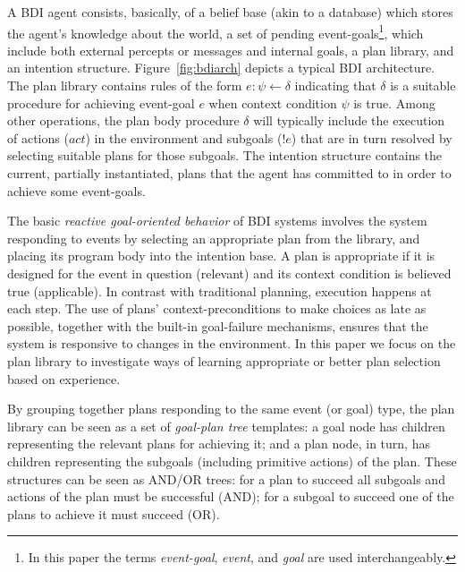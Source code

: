 A BDI agent consists, basically, of a belief base (akin to a
database) which stores the agent's knowledge about the world, a set of
pending event-goals\footnote{In this paper the terms {\em event-goal}, {\em event}, and {\em goal} are used interchangeably.}, which include both external percepts or messages and
internal goals, a plan library, and an intention structure.
Figure~\ref{fig:bdiarch} depicts a typical BDI architecture.
The plan library contains rules of the form $e: \psi \leftarrow
\delta$ indicating that $\delta$ is a suitable procedure for achieving
event-goal $e$ when context condition $\psi$ is true.
Among other operations, the plan body procedure $\delta$ will
typically include the 
execution of actions ($act$) in the environment and subgoals ($!e$) that
are in turn resolved by selecting suitable plans for those subgoals.
%
The intention structure contains the current, partially instantiated,
plans that the agent has committed to in order to
achieve some event-goals.

The basic \emph{reactive goal-oriented behavior} of BDI systems involves the
system responding to events by 
selecting an appropriate plan from the library, and placing its
program body into the intention base.
A plan is appropriate if it is designed for the event in question
(relevant) and its context
condition is believed true (applicable).
In contrast with traditional planning, execution happens at each step. The
use of plans' context-preconditions to make choices as
late as possible, together with the built-in goal-failure mechanisms, ensures
that the system is responsive to changes in the environment.
In this paper we focus on the plan library to
investigate ways of learning appropriate or better plan selection
based on experience. 

By grouping together plans responding to the same
event (or goal) type, the plan library can be seen as a set of \emph{goal-plan tree}
templates: a goal node has children representing the
relevant plans for achieving it; and a plan node, in turn, has children
representing the subgoals (including primitive actions) of the plan.
These structures can be seen as AND/OR trees: for a plan to succeed all
subgoals and actions of the plan must be successful (AND); for a subgoal to
succeed one of the plans to achieve it must succeed (OR).


